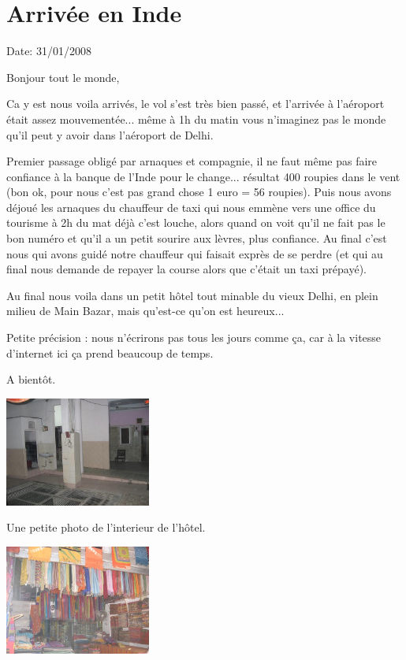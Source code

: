 \section{Arrivée en Inde}

Date: 31/01/2008

\begin{multicols}{2}

Bonjour tout le monde,

Ca y est nous voila arrivés, le vol s'est très bien passé, et l'arrivée à l'aéroport était assez mouvementée... même à 1h du matin vous n'imaginez pas le monde qu'il peut y avoir dans l'aéroport de Delhi.

Premier passage obligé par arnaques et compagnie, il ne faut même pas faire confiance à la banque de l'Inde pour le change... résultat 400 roupies dans le vent (bon ok, pour nous c'est pas grand chose 1 euro = 56 roupies). Puis nous avons déjoué les arnaques du chauffeur de taxi qui nous emmène vers une office du tourisme à 2h du mat déjà c'est louche, alors quand on voit qu'il ne fait pas le bon numéro et qu'il a un petit sourire aux lèvres, plus confiance. Au final c'est nous qui avons guidé notre chauffeur qui faisait exprès de se perdre (et qui au final nous demande de repayer la course alors que c'était un taxi prépayé).

Au final nous voila dans un petit hôtel tout minable du vieux Delhi, en plein milieu de Main Bazar, mais qu'est-ce qu'on est heureux...

Petite précision : nous n'écrirons pas tous les jours comme ça, car à la vitesse d'internet ici ça prend beaucoup de temps.

A bientôt.

\hspace*{-0.65cm}
\includegraphics[width=4.8cm]{articles/Arrivee-en-inde/hotel.jpg}

Une petite photo de l'interieur de l'hôtel.

\hspace*{-0.65cm}
\includegraphics[width=4.8cm]{articles/Arrivee-en-inde/magasin.jpg}


\end{multicols}
